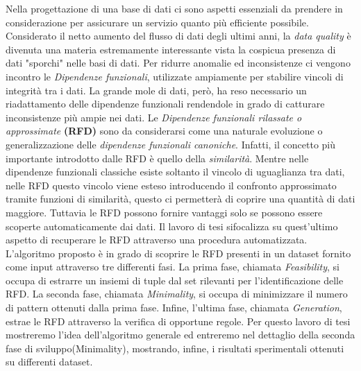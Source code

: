 Nella progettazione di una base di dati ci sono aspetti essenziali da prendere in considerazione per assicurare un servizio quanto più efficiente possibile.
Considerato il netto aumento del flusso di dati degli ultimi anni,  la \emph{data quality} è divenuta una materia estremamente interessante vista la cospicua presenza di dati "sporchi" nelle basi di dati.
Per ridurre anomalie ed inconsistenze ci vengono incontro le \emph{Dipendenze funzionali}, utilizzate ampiamente per stabilire vincoli di integrità tra i dati.
La grande mole di dati, però, ha reso necessario un riadattamento delle dipendenze funzionali rendendole in grado di catturare inconsistenze più ampie nei dati. 
Le \emph{Dipendenze funzionali rilassate o approssimate} \textbf{(RFD)} sono da considerarsi come una naturale evoluzione o generalizzazione delle \emph{dipendenze funzionali canoniche}. Infatti,
il concetto più importante introdotto dalle RFD è quello della \emph{similarità}.
Mentre nelle dipendenze funzionali classiche esiste soltanto il vincolo di uguaglianza tra dati, nelle RFD questo vincolo viene esteso introducendo il confronto approssimato tramite funzioni di similarità, questo ci permetterà di coprire una quantità di dati maggiore.
Tuttavia le RFD possono fornire vantaggi solo se possono essere scoperte automaticamente dai dati.
Il lavoro di tesi sifocalizza su quest'ultimo aspetto di recuperare le RFD attraverso una procedura automatizzata.
L'algoritmo proposto è in grado di scoprire le RFD presenti in un dataset fornito come input attraverso tre differenti fasi. La prima fase, chiamata \emph{Feasibility}, si occupa di estrarre un insiemi di tuple dal set rilevanti per l'identificazione delle RFD. La seconda fase, chiamata \emph{Minimality}, si occupa di minimizzare il numero di pattern ottenuti dalla prima fase. Infine, l'ultima fase, chiamata \emph{Generation}, estrae le RFD attraverso la verifica di opportune regole.
Per questo lavoro di tesi mostreremo l'idea dell'algoritmo generale ed entreremo nel dettaglio della seconda fase di sviluppo(Minimality), mostrando, infine, i risultati sperimentali ottenuti su differenti dataset.
